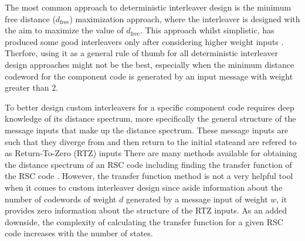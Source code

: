The most common approach to deterministic interleaver design is the minimum free distance ($d_{\text{free}}$) maximization approach, where the interleaver is designed with the aim to maximize the value of $d_{\text{free}}$. This approach whilst simplistic, has produced some good interleavers only after considering higher weight inputs \cite{ref5}. Therfore,
using it as a general rule of thumb for all deterministic interleaver design approaches might not be the best, especially when the minimum distance codeword for the component code is generated by an input message with weight greater than 2. 

To better design custom interleavers for a specific component code requires deep knowledge of its distance spectrum, more specifically the general structure of the message inputs that make up the distance spectrum. These message inputs are such that they diverge from and then return to the initial stateand are refered to as Return-To-Zero (RTZ) inputs
There are many methods available for obtaining the distance spectrum of an RSC code including finding the transfer function of the RSC code \cite{ref3}.
However, the transfer function method is not a very helpful tool when it comes to custom interleaver design since aside information about the number of codewords of weight $d$ generated by a message input of weight $w$, it provides zero information about the structure of the RTZ inputs. As an added downside, the complexity of calculating the transfer function for a given RSC code increases with the number of states.





